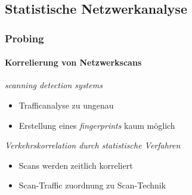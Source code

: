 
\subsection{Statistische Netzwerkanalyse}
\begin{frame}
\frametitle{Probing}
\framesubtitle{Korrelierung von Netzwerkscans}

\begin{alertblock}{\textit{scanning detection systems}}
    \begin{itemize}
        \item Trafficanalyse zu ungenau
        \item Erstellung eines \textit{fingerprints} kaum möglich
    \end{itemize}
\end{alertblock}

\begin{exampleblock}{\textit{Verkehrskorrelation durch statistische Verfahren}}
    \begin{itemize}
        \item Scans werden zeitlich korreliert
        \item Scan-Traffic zuordnung zu Scan-Technik
    \end{itemize}
\end{exampleblock}

\end{frame}
